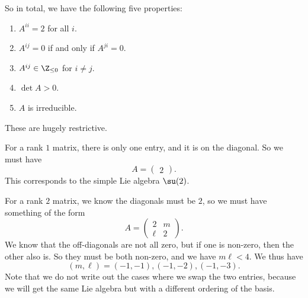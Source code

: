 \documentclass[a4paper]{article}
\begin{document}
So in total, we have the following five properties:
\begin{prop}\leavevmode
  \begin{enumerate}
    \item $A^{ii} = 2$ for all $i$.
    \item $A^{ij} = 0$ if and only if $A^{ji} = 0$.
    \item $A^{ij} \in \Z_{\leq 0}$ for $i \not= j$.
    \item $\det A > 0$.
    \item $A$ is irreducible.
  \end{enumerate}
\end{prop}

These are hugely restrictive.
\begin{eg}
  For a rank $1$ matrix, there is only one entry, and it is on the diagonal. So we must have
  \[
    A =
    \begin{pmatrix}
      2
    \end{pmatrix}.
  \]
  This corresponds to the simple Lie algebra $\su(2)$.
\end{eg}

\begin{eg}
  For a rank $2$ matrix, we know the diagonals must be $2$, so we must have something of the form
  \[
    A =
    \begin{pmatrix}
      2 & m\\
      \ell & 2
    \end{pmatrix}.
  \]
  We know that the off-diagonals are not all zero, but if one is non-zero, then the other also is. So they must be both non-zero, and we have $m\ell < 4$. We thus have
  \[
    (m, \ell) = (-1, -1), (-1, -2), (-1, -3).
  \]
  Note that we do not write out the cases where we swap the two entries, because we will get the same Lie algebra but with a different ordering of the basis.
\end{eg}
\end{document}
